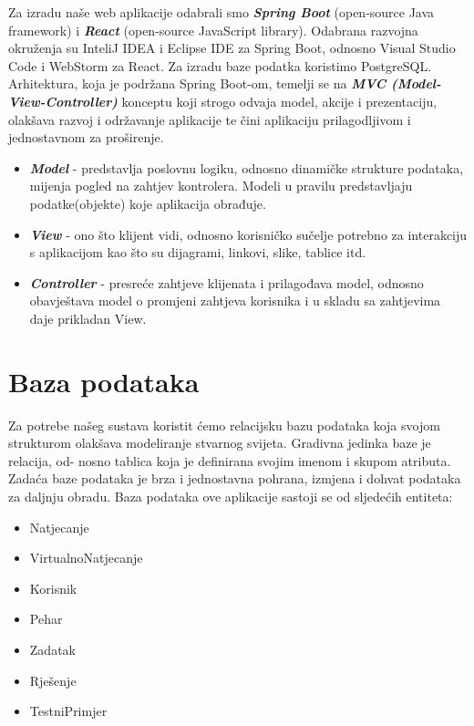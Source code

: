Za izradu naše web aplikacije odabrali smo \textit{\textbf{Spring Boot}} (open-source Java framework) i \textit{\textbf{React}} (open-source JavaScript library). Odabrana razvojna okruženja su InteliJ IDEA i Eclipse IDE za Spring Boot, odnosno Visual Studio Code i WebStorm za React. Za izradu baze podatka koristimo PostgreSQL.
Arhitektura, koja je podržana Spring Boot-om, temelji se na \textit{\textbf{MVC (Model-View-Controller)}} konceptu koji strogo odvaja model, akcije i prezentaciju, olakšava razvoj i održavanje aplikacije te čini aplikaciju prilagodljivom i jednostavnom za proširenje.
\begin{itemize}
	\item \textit{\textbf{Model}} - predstavlja poslovnu logiku, odnosno dinamičke strukture podataka, mijenja pogled na zahtjev kontrolera. Modeli u pravilu predstavljaju podatke(objekte) koje aplikacija obrađuje.
	\item \textit{\textbf{View}} - ono što klijent vidi, odnosno korisničko sučelje potrebno za interakciju s aplikacijom kao što su dijagrami, linkovi, slike, tablice itd.
	\item \textit{\textbf{Controller}} - presreće zahtjeve klijenata i prilagođava model, odnosno obavještava model o promjeni zahtjeva korisnika i u skladu sa zahtjevima daje prikladan View.
\end{itemize}

\section{Baza podataka}
			
Za potrebe našeg sustava koristit ćemo relacijsku bazu podataka koja svojom strukturom olakšava modeliranje stvarnog svijeta. Gradivna jedinka baze je relacija, od- nosno tablica koja je definirana svojim imenom i skupom atributa. Zadaća baze podataka je brza i jednostavna pohrana, izmjena i dohvat podataka za daljnju obradu. Baza podataka ove aplikacije sastoji se od sljedećih entiteta:
\begin{itemize}
	\item Natjecanje
	\item VirtualnoNatjecanje
	\item Korisnik
	\item Pehar
	\item Zadatak
	\item Rješenje
	\item TestniPrimjer		
\end{itemize}
				
